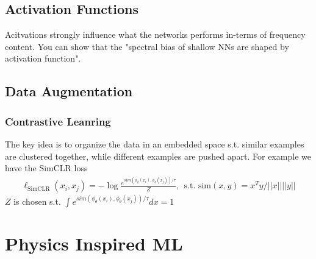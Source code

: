 \subsection{Activation Functions}
Acitvations strongly influence what the networks performs in-terms of frequency content. You can show that the "spectral bias of shallow NNs are shaped by activation function".

\subsection{Data Augmentation}
\subsubsection{Contrastive Leanring}
The key idea is to organize the data in an embedded space s.t. similar examples are clustered together, while different examples are pushed apart. For example we have the SimCLR loss
\begin{align}
	\ell_{\text{SimCLR}}(x_i, x_j) = - \log \frac{e^{sim(\phi_\theta(x_i), \phi_\theta(x_j) )/ \tau}}{Z}, ~~ \text{s.t. } \text{sim}(x,y) = x^T y / ||x||||y|| 
\end{align}
$Z$ is chosen s.t. $\int e^{sim(\phi_\theta(x_i), \phi_\theta(x_j) )/ \tau} dx = 1$


\section{Physics Inspired ML}

